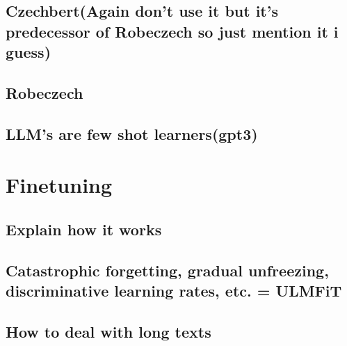 \subsection{Czechbert(Again don't use it but it's predecessor of Robeczech so just mention it i guess)}
\subsection{Robeczech}
\subsection{LLM's are few shot learners(gpt3)}

\section{Finetuning}
\subsection{Explain how it works}
\subsection{Catastrophic forgetting, gradual unfreezing, discriminative learning rates, etc. = ULMFiT}
\subsection{How to deal with long texts }
\cite{sunHowFineTuneBERT2020}


